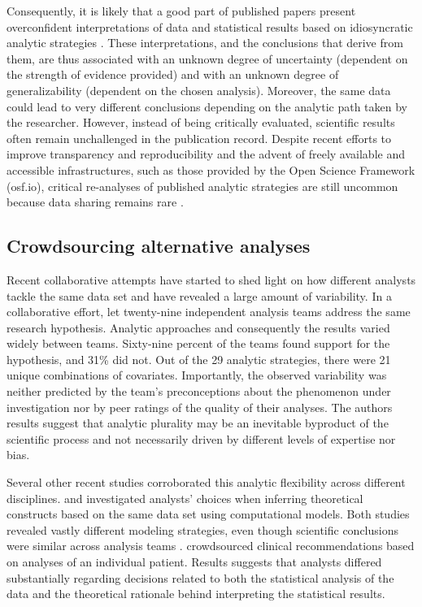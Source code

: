 \documentclass[Review,times,sageh]{sagej}
\begin{document}
Consequently, it is likely that a good part of published papers present overconfident interpretations of data and statistical results based on idiosyncratic analytic strategies \citep[e.g.,][]{simmons2011false, gelman2014statistical}.
These interpretations, and the conclusions that derive from them, are thus associated with an unknown degree of uncertainty (dependent on the strength of evidence provided) and with an unknown degree of generalizability (dependent on the chosen analysis).
Moreover, the same data could lead to very different conclusions depending on the analytic path taken by the researcher.
However, instead of being critically evaluated, scientific results often remain unchallenged in the publication record.
Despite recent efforts to improve transparency and reproducibility \citep[e.g.][]{miguel2014promoting, klein2018practical} and the advent of freely available and accessible infrastructures, such as those provided by the Open Science Framework (osf.io), critical re-analyses of published analytic strategies are still uncommon because data sharing remains rare \citep{wicherts2006poor}.

\hypertarget{crowdsourcing-alternative-analyses}{%
\subsection{Crowdsourcing alternative analyses}\label{crowdsourcing-alternative-analyses}}

Recent collaborative attempts have started to shed light on how different analysts tackle the same data set and have revealed a large amount of variability.
In a collaborative effort, \citet{silberzahn2018many} let twenty-nine independent analysis teams address the same research hypothesis.
Analytic approaches and consequently the results varied widely between teams.
Sixty-nine percent of the teams found support for the hypothesis, and 31\% did not.
Out of the 29 analytic strategies, there were 21 unique combinations of covariates.
Importantly, the observed variability was neither predicted by the team's preconceptions about the phenomenon under investigation nor by peer ratings of the quality of their analyses.
The authors results suggest that analytic plurality may be an inevitable byproduct of the scientific process and not necessarily driven by different levels of expertise nor bias.

Several other recent studies corroborated this analytic flexibility across different disciplines.
\citet{dutilh2019} and \citet{starns2019assessing} investigated analysts' choices when inferring theoretical constructs based on the same data set using computational models.
Both studies revealed vastly different modeling strategies, even though scientific conclusions were similar across analysis teams \citetext{\citealp[see also][ on analytic flexibility in ecology]{Parker2020}; \citealp[and][ on neuroimaging data]{botvinik-nezer2020}}.
\citet{bastiaansen2020} crowdsourced clinical recommendations based on analyses of an individual patient.
Results suggests that analysts differed substantially regarding decisions related to both the statistical analysis of the data and the theoretical rationale behind interpreting the statistical results.
\end{document}

